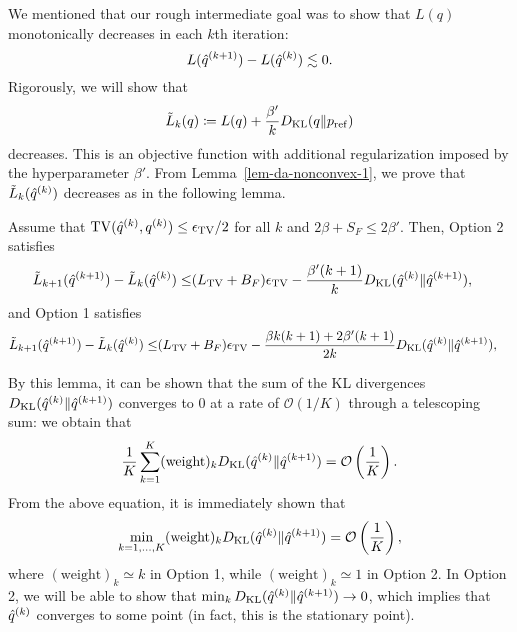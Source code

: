 We mentioned that our rough intermediate goal was to show that $L(q)$ monotonically decreases in each $k$th iteration:
\begin{equation}
    L(\hat{q}^{(k+1)}) - L(\hat{q}^{(k)}) \lesssim 0.
\end{equation}
Rigorously, we will show that
\begin{equation}
    \tilde{L}_k(q) \coloneq L(q) + \frac{\beta'}{k}D_{\mathrm{KL}}(q\|p_{\rm{ref}})
\end{equation}
decreases. This is an objective function with additional regularization imposed by the hyperparameter $\beta'$. 
From Lemma~\ref{lem-da-nonconvex-1}, we prove that $\tilde{L}_k(\hat{q}^{(k)})$ decreases as in the following lemma. 
\begin{lem}\label{lem:LdiffInduction}
    Assume that $\mathrm{TV}(\hat{q}^{(k)}, q^{(k)}) \leq \epsilon_{\mathrm{TV}}/2$ for all $k$ and $2\beta + S_F \leq 2 \beta'$. Then, Option 2 satisfies
    \begin{align}
        \tilde{L}_{k+1}(\qstarnext) - \tilde{L}_k(\qstark)
         \leq 
         & (\LipTV +B_F)\epsilon_\TV    %
         - \frac{\beta' (k+1)}{k} \KL(\qstark \|\qstarnext),
        \label{eq-da-nonconvex-monotone}
    \end{align}
    and Option 1 satisfies 
    \begin{align}
        \tilde{L}_{k+1}(\qstarnext) - \tilde{L}_k(\qstark)
         \leq 
         & (\LipTV +B_F)\epsilon_\TV    %
         - \frac{\beta k(k+1)  +2 \beta' (k+1)}{2k} \KL(\qstark \|\qstarnext),
        \label{eq-da-nonconvex-monotone}
    \end{align}
\end{lem}
By this lemma, it can be shown that the sum of the KL divergences $D_{\mathrm{KL}}(\hat{q}^{(k)} \|\hat{q}^{(k+1)})$ converges to 0 at a rate of $\mathcal{O}(1/K)$ through a telescoping sum:
we obtain that
\begin{equation}
    \frac{1}{K}\sum_{k=1}^K (\text{weight})_k D_{\mathrm{KL}}(\hat{q}^{(k)}\|\hat{q}^{(k+1)}) = \mathcal{O}\left(\frac{1}{K}\right).
\end{equation}
From the above equation, it is immediately shown that
\begin{equation}
    \min_{k=1,...,K} (\text{weight})_k D_{\mathrm{KL}}(\hat{q}^{(k)}\|\hat{q}^{(k+1)}) = \mathcal{O}\left(\frac{1}{K}\right),
\end{equation}
where $(\text{weight})_k \simeq k$ in Option 1, while $(\text{weight})_k \simeq 1$ in Option 2. In Option 2, we will be able to show that $\min_k D_{\mathrm{KL}}(\hat{q}^{(k)}\|\hat{q}^{(k+1)}) \to 0$, which implies that $\hat{q}^{(k)}$ converges to some point (in fact, this is the stationary point).


